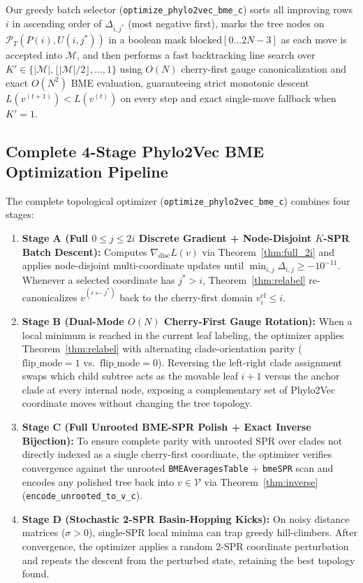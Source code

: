 \documentclass[11pt,a4paper]{article}
\theoremstyle{definition}
\begin{document}
Our greedy batch selector (\texttt{optimize\_phylo2vec\_bme\_c}) sorts all improving rows $i$ in ascending order of $\Delta_{i, j^*}$ (most negative first), marks the tree nodes on $\mathcal{P}_T(P(i), U(i, j^*))$ in a boolean mask $\text{blocked}[0 \dots 2N-3]$ as each move is accepted into $\mathcal{M}$, and then performs a fast backtracking line search over $K' \in \{|\mathcal{M}|, \lfloor |\mathcal{M}|/2 \rfloor, \dots, 1\}$ using $O(N)$ cherry-first gauge canonicalization and exact $O(N^2)$ BME evaluation, guaranteeing strict monotonic descent $L(v^{(t+1)}) < L(v^{(t)})$ on every step and exact single-move fallback when $K' = 1$.

\subsection{Complete 4-Stage Phylo2Vec BME Optimization Pipeline}
The complete topological optimizer (\texttt{optimize\_phylo2vec\_bme\_c}) combines four stages:
\begin{enumerate}
    \item \textbf{Stage A (Full $0 \le j \le 2i$ Discrete Gradient + Node-Disjoint $K$-SPR Batch Descent):} Computes $\nabla_{\text{disc}} L(v)$ via Theorem~\ref{thm:full_2i} and applies node-disjoint multi-coordinate updates until $\min_{i, j} \Delta_{i, j} \ge -10^{-11}$. Whenever a selected coordinate has $j^* > i$, Theorem~\ref{thm:relabel} re-canonicalizes $v^{(i \leftarrow j^*)}$ back to the cherry-first domain $v^{\text{cf}}_i \le i$.
    \item \textbf{Stage B (Dual-Mode $O(N)$ Cherry-First Gauge Rotation):} When a local minimum is reached in the current leaf labeling, the optimizer applies Theorem~\ref{thm:relabel} with alternating clade-orientation parity ($\text{flip\_mode} = 1$ vs.\ $\text{flip\_mode} = 0$). Reversing the left-right clade assignment swaps which child subtree acts as the movable leaf $i+1$ versus the anchor clade at every internal node, exposing a complementary set of Phylo2Vec coordinate moves without changing the tree topology.
    \item \textbf{Stage C (Full Unrooted BME-SPR Polish + Exact Inverse Bijection):} To ensure complete parity with unrooted SPR over clades not directly indexed as a single cherry-first coordinate, the optimizer verifies convergence against the unrooted \texttt{BMEAveragesTable} + \texttt{bmeSPR} scan and encodes any polished tree back into $v \in \mathcal{V}$ via Theorem~\ref{thm:inverse} (\texttt{encode\_unrooted\_to\_v\_c}).
    \item \textbf{Stage D (Stochastic 2-SPR Basin-Hopping Kicks):} On noisy distance matrices ($\sigma > 0$), single-SPR local minima can trap greedy hill-climbers. After convergence, the optimizer applies a random 2-SPR coordinate perturbation and repeats the descent from the perturbed state, retaining the best topology found.
\end{enumerate}
\end{document}
